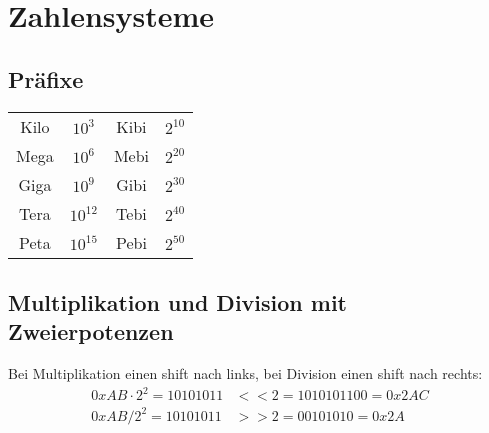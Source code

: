 \section{Zahlensysteme}
	\subsection{Präfixe}
		\begin{tabular}{c|c|c|c}
			Kilo & $10^3$ & Kibi & $2^{10}$ \\
			Mega & $10^6$ & Mebi & $2^{20}$ \\
			Giga & $10^9$ & Gibi & $2^{30}$ \\
			Tera & $10^12$ & Tebi & $2^{40}$ \\
			Peta & $10^15$ & Pebi & $2^{50}$
		\end{tabular}
	\subsection{Multiplikation und Division mit Zweierpotenzen}
		Bei Multiplikation einen shift nach links, bei Division einen shift nach rechts:
		\begin{align*}
			0xAB\cdot 2^2=10101011&<<2=1010101100=0x2AC \\
			0xAB/2^2= 10101011&>>2=00101010=0x2A
		\end{align*}